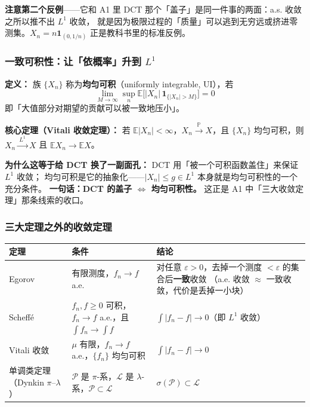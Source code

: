 \textbf{注意第二个反例}——它和 A1 里 DCT 那个「盖子」是同一件事的两面：a.s. 收敛之所以推不出 $L^1$ 收敛，
就是因为极限过程的「质量」可以逃到无穷远或挤进零测集。$X_n=n\mathbf 1_{(0,1/n)}$ 正是教科书里的标准反例。

\subsubsection{一致可积性：让「依概率」升到 $L^1$}

\textbf{定义：} 族 $\{X_n\}$ 称为\textbf{均匀可积}（uniformly integrable, UI），若
\[
\lim_{M\to\infty}\sup_n \mathbb E\big[|X_n|\,\mathbf 1_{\{|X_n|>M\}}\big]=0
\]
即「大值部分对期望的贡献可以被一致地压小」。

\textbf{核心定理（Vitali 收敛定理）：} 若 $\mathbb E|X_n|<\infty$，$X_n\xrightarrow{\ \mathbb P\ }X$，且 $\{X_n\}$ 均匀可积，则
$X_n\xrightarrow{\ L^1\ }X$ 且 $\mathbb E X_n\to\mathbb E X$。

\textbf{为什么这等于给 DCT 换了一副面孔：} DCT 用「被一个可积函数盖住」来保证 $L^1$ 收敛；
均匀可积是它的抽象化——$|X_n|\le g\in L^1$ 本身就是均匀可积性的一个充分条件。
\textbf{一句话：DCT 的盖子 $\iff$ 均匀可积性。} 这正是 A1 中「三大收敛定理」那条线索的收口。

\subsubsection{三大定理之外的收敛定理}

\begin{center}
\begin{tabular}{L{3.0cm}L{5.0cm}L{6.2cm}}
\toprule
\textbf{定理} & \textbf{条件} & \textbf{结论} \\
\midrule
Egorov & 有限测度，$f_n\to f$ a.e. & 对任意 $\varepsilon>0$，去掉一个测度 $<\varepsilon$ 的集合后\textbf{一致}收敛
（a.e. 收敛 $\approx$ 一致收敛，代价是丢掉一小块）\\
\addlinespace
Scheffé & $f_n,f\ge0$ 可积，$f_n\to f$ a.e.，且 $\int f_n\to\int f$ & $\int|f_n-f|\to0$（即 $L^1$ 收敛） \\
\addlinespace
Vitali 收敛 & $\mu$ 有限，$f_n\to f$ a.e.，$\{f_n\}$ 均匀可积 & $\int|f_n-f|\to0$ \\
\addlinespace
单调类定理（Dynkin $\pi$--$\lambda$） & $\mathcal P$ 是 $\pi$-系，$\mathcal L$ 是 $\lambda$-系，$\mathcal P\subset\mathcal L$ &
$\sigma(\mathcal P)\subset\mathcal L$ \\
\bottomrule
\end{tabular}
\end{center}

